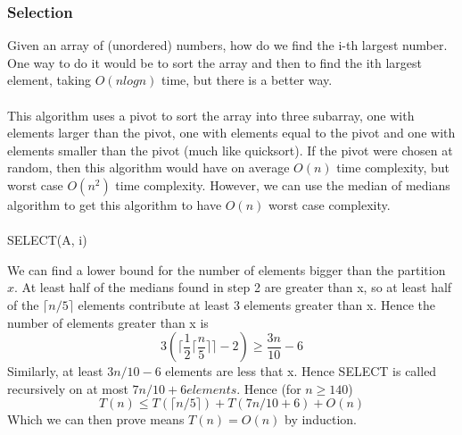 \documentclass{article}
\begin{document}
        \subsubsection{Selection}
        Given an array of (unordered) numbers, how do we find the i-th largest number. One way to do it would be to sort the array and then to find the ith largest element, taking $O(n log n)$ time, but there is a better way. \\ \\
        This algorithm uses a pivot to sort the array into three subarray, one with elements larger than the pivot, one with elements equal to the pivot and one with elements smaller than the pivot (much like quicksort). If the pivot were chosen at random, then this algorithm would have on average $O(n)$ time complexity, but worst case $O(n^2)$ time complexity. However, we can use the median of medians algorithm to get this algorithm to have $O(n)$ worst case complexity. \\ \\
        SELECT(A, i)
        \begin{algorithmic}[1]
        \end{algorithmic}
        We can find a lower bound for the number of elements bigger than the partition $x$. At least half of the medians found in step 2 are greater than x, so at least half of the $\lceil n / 5 \rceil$ elements contribute at least 3 elements greater than x. Hence the number of elements greater than x is 
        \[ 3 \left(\lceil \frac{1}{2} \lceil \frac{n}{5} \rceil \rceil - 2 \right) \geq \frac{3n}{10} - 6\]
        Similarly, at least $3n/10 - 6$ elements are less that x. Hence SELECT is called recursively on at most $7n / 10 + 6 elements$. Hence (for $n \geq 140$)
        \[ T(n) \leq T(\lceil n / 5 \rceil) + T(7n / 10 + 6) + O(n) \]
        Which we can then prove means $T(n) = O(n)$ by induction.
\end{document}
